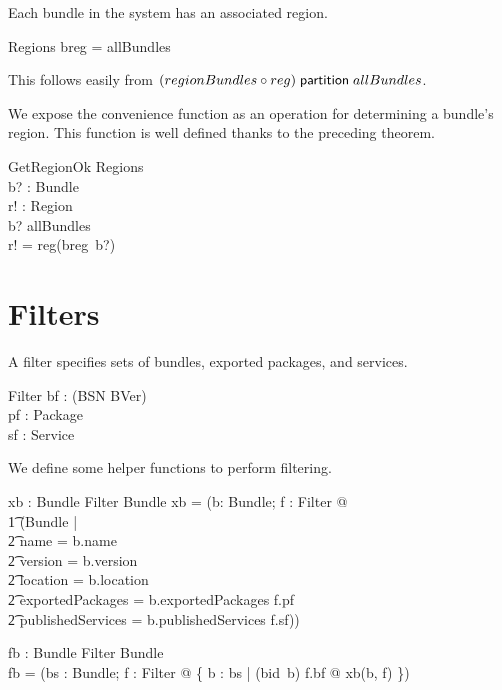 \documentclass[a4paper,9pt]{article}
\begin{document}
Each bundle in the system has an associated region.
\begin{argue}
  Regions \shows \dom breg = allBundles \\
\end{argue}
This follows easily from $(regionBundles \circ reg) \mathrel{\mathsf{partition}} allBundles$.

We expose the convenience function as an operation for determining a bundle's region.
This function is well defined thanks to the preceding theorem.
\begin{schema}{GetRegionOk}
  \Xi Regions \\
  b? : Bundle \\
  r! : Region \\
\where
  b? \in allBundles \\
  r! = reg(breg~b?) \\
\end{schema}

\clearpage
\section{Filters}
\label{cha:filters}

A filter specifies sets of bundles, exported packages, and services.
\begin{schema}{Filter}
  bf : \power (BSN \cross BVer) \\
  pf : \power Package \\
  sf : \power Service \\
\end{schema}

We define some helper functions to perform filtering.
\begin{axdef}
  xb : Bundle \cross Filter \fun Bundle
\where
  xb = (\lambda b: Bundle; f : Filter @ \\
\t1  (\mu Bundle | \\
\t2 name = b.name \land \\
\t2 version = b.version \land \\
\t2 location = b.location \land \\
\t2 exportedPackages = b.exportedPackages \cap f.pf \land \\
\t2 publishedServices = b.publishedServices \cap f.sf))
\end{axdef}

\begin{axdef}
  fb : \power Bundle \cross Filter \fun \power Bundle \\
\where
  fb = (\lambda bs : \power Bundle; f : Filter @ \{ b : bs | (bid~b) \in f.bf @ xb(b, f) \}) \\
\end{axdef}
\end{document}
